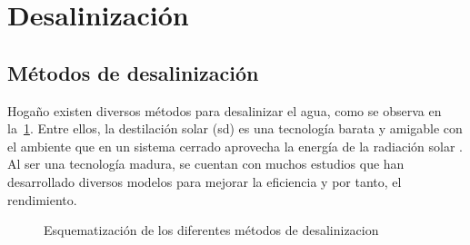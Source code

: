 \section{Desalinización}
	
	\subsection{Métodos de desalinización}
	
		Hogaño existen diversos métodos para desalinizar el agua, como se observa en la~\cref{fig:metodos-desalacion}. Entre ellos, la destilación solar (\acrshort{sd}) es una tecnología barata y amigable con el ambiente que en un sistema cerrado aprovecha la energía de la radiación solar \cite{singh_active_2020}. Al ser una tecnología madura, se cuentan con muchos estudios que han desarrollado diversos modelos para mejorar la eficiencia y por tanto, el rendimiento.
		
		\begingroup
			\tikzexternaldisable
			\begin{figure}[H]
				\centering
				
				\caption{Esquematización de los diferentes métodos de \gls{desalinizacion}}
				\label{fig:metodos-desalacion}
			\end{figure}
			\tikzexternalenable
		\endgroup
		
		